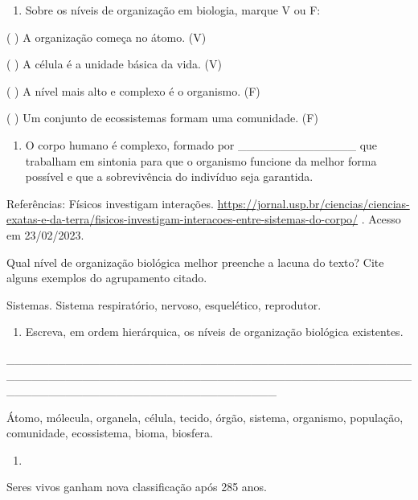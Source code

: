 \begin{enumerate}
\def\labelenumi{\arabic{enumi}.}
\item
  Sobre os níveis de organização em biologia, marque V ou F:
\end{enumerate}

( ) A organização começa no átomo. (V)

( ) A célula é a unidade básica da vida. (V)

( ) A nível mais alto e complexo é o organismo. (F)

( ) Um conjunto de ecossistemas formam uma comunidade. (F)

\begin{enumerate}
\def\labelenumi{\arabic{enumi}.}
\item
  O corpo humano é complexo, formado por \_\_\_\_\_\_\_\_\_\_\_\_\_\_
  que trabalham em sintonia para que o organismo funcione da melhor
  forma possível e que a sobrevivência do indivíduo seja garantida.
\end{enumerate}

Referências: Físicos investigam interações.
\url{https://jornal.usp.br/ciencias/ciencias-exatas-e-da-terra/fisicos-investigam-interacoes-entre-sistemas-do-corpo/}
. Acesso em 23/02/2023.

Qual nível de organização biológica melhor preenche a lacuna do texto?
Cite alguns exemplos do agrupamento citado.

Sistemas. Sistema respiratório, nervoso, esquelético, reprodutor.

\begin{enumerate}
\def\labelenumi{\arabic{enumi}.}
\item
  Escreva, em ordem hierárquica, os níveis de organização biológica
  existentes.
\end{enumerate}

\_\_\_\_\_\_\_\_\_\_\_\_\_\_\_\_\_\_\_\_\_\_\_\_\_\_\_\_\_\_\_\_\_\_\_\_\_\_\_\_\_\_\_\_\_\_\_\_\_\_\_\_\_\_\_\_\_\_\_\_\_\_\_\_\_\_\_\_\_\_\_\_\_\_\_\_\_\_\_\_\_\_\_\_\_\_\_\_\_\_\_\_\_\_\_\_\_\_\_\_\_\_\_\_\_\_\_\_\_\_\_\_\_\_\_\_\_\_\_\_\_\_\_\_\_\_\_\_

Átomo, mólecula, organela, célula, tecido, órgão, sistema, organismo,
população, comunidade, ecossistema, bioma, biosfera.

\begin{enumerate}
\def\labelenumi{\arabic{enumi}.}
\item
\end{enumerate}

\protect\hypertarget{_Hlk128243830}{}{}Seres vivos ganham nova
classificação após 285 anos.

